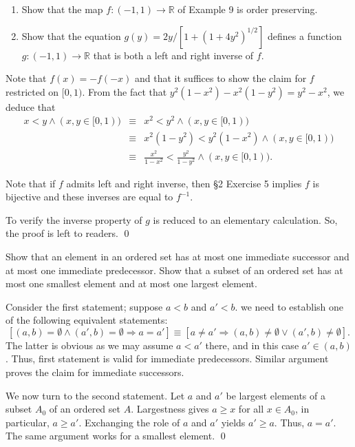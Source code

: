 \documentclass[a4paper,12pt]{article}
\begin{document}
\begin{exe}\leavevmode \par
	\begin{enumerate}
		\item
		      Show that the map \( f:(-1,1)\to \mathbb{R} \) of Example 9 is order preserving.
		      
		\item
		      Show that the equation \( g(y)= {2y}/\left[ 1+(1+4y^2)^{1/2} \right] \)
		      defines a function \( g:(-1,1) \to \mathbb{R} \)
		      that is both a left and right inverse of \( f \).
	\end{enumerate}
\end{exe}\begin{sol}\leavevmode \par
	Note that \( f(x) = -f(-x) \) and that it suffices to show the claim for
	\( f \) restricted on \( [0,1) \).
	From the fact that
	\( y^2(1-x^2) - x^2(1-y^2) = y^2 - x^2\),
	we deduce that
	\begin{eqnarray*}
		x<y \wedge(x,y\in [0,1))
		&\equiv&
		x^2<y^2 \wedge(x,y\in [0,1))\\
		&\equiv&
		x^2(1-y^2)<y^2(1-x^2) \wedge(x,y\in [0,1))\\
		&\equiv&
		\frac{x^2}{1-x^2}<\frac{y^2}{1-y^2}\wedge(x,y\in [0,1)).
	\end{eqnarray*}
	
	Note that if \( f \) admits left and right inverse,
	then \S2 Exercise 5 implies
	\( f \) is bijective and these inverses are equal to \( f ^{-1}\).
	
	To verify the inverse property of \( g \) is reduced to an elementary calculation.
	So, the proof is left to readers.
	\qed\end{sol}

\begin{exe}
	Show that an element in an ordered set has at most one immediate successor and at most one immediate predecessor.
	Show that a subset of an ordered set has at most one smallest element and at most one largest element.
\end{exe}\begin{sol}%
	Consider the first statement;
	suppose \( a<b \) and \( a'<b \).
	we need to establish one of the following equivalent statements:
	\begin{equation*}
		\left[(a,b) = \emptyset \wedge (a',b) = \emptyset \Rightarrow a=a' \right]
		\equiv
		\left[a \neq a' \Rightarrow
			(a,b) \neq \emptyset \vee (a',b) \neq \emptyset \right].
	\end{equation*}
	The latter is obvious as
	we may assume \( a<a' \) there, and in this case
	\( a'\in(a,b) \).
	Thus, first statement is valid for immediate predecessors.
	Similar argument proves the claim for immediate successors.
	
	We now turn to the second statement.
	Let
	\( a \)
	and
	\( a' \)
	be largest elements of a subset \( A_0 \) of an ordered set \( A \).
	Largestness gives \( a \ge x \) for all \( x \in A_0 \), in particular,
	\( a \ge a' \).
	Exchanging the role of \( a \) and \( a' \) yields \( a'\ge a \).
	Thus, \( a=a' \).
	The same argument works for a smallest element.
	\qed\end{sol}
\end{document}
